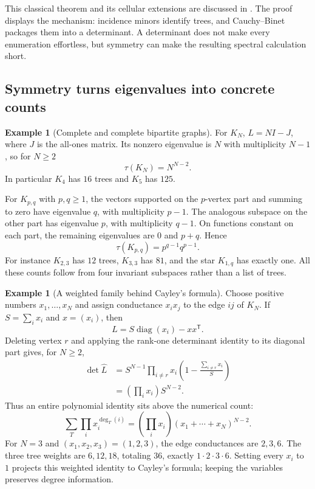 \documentclass[11pt]{article}
\theoremstyle{definition}
\newtheorem{example}[theorem]{Example}
\theoremstyle{remark}
\begin{document}
This classical theorem and its cellular extensions are discussed in \cite{glinDKM2016}. The proof displays the mechanism: incidence minors identify trees, and Cauchy--Binet packages them into a determinant. A determinant does not make every enumeration effortless, but symmetry can make the resulting spectral calculation short.

\subsection{Symmetry turns eigenvalues into concrete counts}

\begin{example}[Complete and complete bipartite graphs]\label{ex:glin-complete}
For $K_N$, $L=NI-J$, where $J$ is the all-ones matrix. Its nonzero eigenvalue is $N$ with multiplicity $N-1$, so for $N\ge2$
\[
 \tau(K_N)=N^{N-2}.
\]
In particular $K_4$ has $16$ trees and $K_5$ has $125$.

For $K_{p,q}$ with $p,q\ge1$, the vectors supported on the $p$-vertex part and summing to zero have eigenvalue $q$, with multiplicity $p-1$. The analogous subspace on the other part has eigenvalue $p$, with multiplicity $q-1$. On functions constant on each part, the remaining eigenvalues are $0$ and $p+q$. Hence
\[
 \tau(K_{p,q})=p^{q-1}q^{p-1}.
\]
For instance $K_{2,3}$ has $12$ trees, $K_{3,3}$ has $81$, and the star $K_{1,q}$ has exactly one. All these counts follow from four invariant subspaces rather than a list of trees.
\end{example}

\begin{example}[A weighted family behind Cayley's formula]\label{ex:glin-weighted-cayley}
Choose positive numbers $x_1,\ldots,x_N$ and assign conductance $x_ix_j$ to the edge $ij$ of $K_N$. If $S=\sum_i x_i$ and $x=(x_i)$, then
\[
 L=S\operatorname{diag}(x_i)-xx^{\mathsf T}.
\]
Deleting vertex $r$ and applying the rank-one determinant identity to its diagonal part gives, for $N\ge2$,
\begin{align*}
 \det\widehat L
 &=S^{N-1}\prod_{i\ne r}x_i
 \left(1-\frac{\sum_{i\ne r}x_i}{S}\right)\\
 &=\left(\prod_i x_i\right)S^{N-2}.
\end{align*}
Thus an entire polynomial identity sits above the numerical count:
\[
 \sum_T\prod_i x_i^{\deg_T(i)}
 =\left(\prod_i x_i\right)(x_1+\cdots+x_N)^{N-2}.
\]
For $N=3$ and $(x_1,x_2,x_3)=(1,2,3)$, the edge conductances are $2,3,6$. The three tree weights are $6,12,18$, totaling $36$, exactly $1\cdot2\cdot3\cdot6$. Setting every $x_i$ to $1$ projects this weighted identity to Cayley's formula; keeping the variables preserves degree information.
\end{example}
\end{document}
